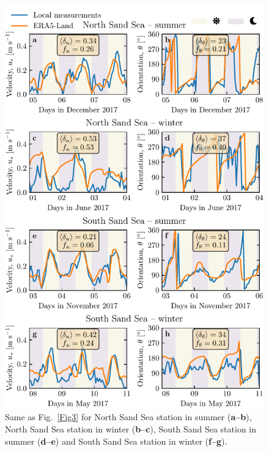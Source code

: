 \begin{figure}
\centering
\includegraphics[scale=1]{Figures/Figure5.pdf}
\caption{Same as Fig.~\ref{Fig3} for North Sand Sea station in summer (\textbf{a--b}), North Sand Sea station in winter (\textbf{b--c}), South Sand Sea station in summer (\textbf{d--e}) and South Sand Sea station in winter (\textbf{f--g}).}
\label{Fig5}
\end{figure}

